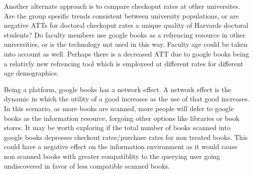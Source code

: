 \documentclass{article}
\begin{document}
Another alternate approach is to compare checkoput rates at other universites. Are the group spesific trends consistent between university populations, or are negative ATTs for doctoral checkoput rates a unique quality of Harvards doctoral students? Do faculty members use google books as a refrencing resource in other universities, or is the technology not used in this way. Faculty age could be taken into account as well. Perhaps there is a decreased ATT due to google books being a relativly new refrencing tool which is employeed at different rates for different age demographics.

Being a platform, google books has a network effect. A network effect is the dynamic in which the utility of a good increases as the use of that good increases. In this scenario, as more books are scanned, more people will defer to google books as the information resource, forgoing other options like libraries or book stores. It may be worth exploring if the total number of books scanned into google books depresses checkout rates/purchase rates for non treated books. This could have a negative effect on the information environment as it would cause non scanned books with greater compatiblity to the querying user going undiscovered in favor of less compatible scanned books. 
\end{document}
